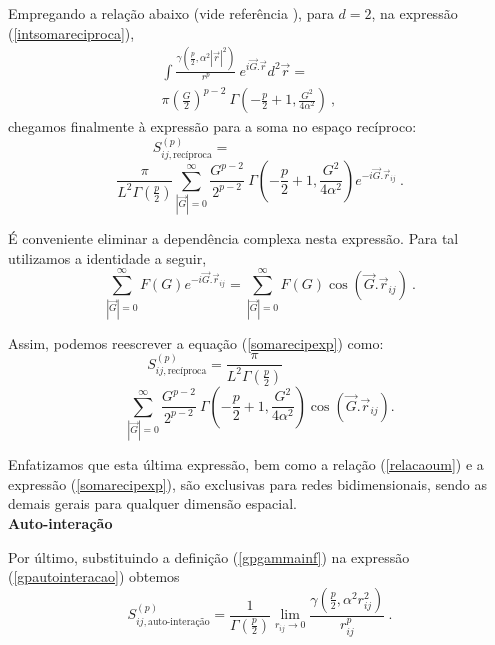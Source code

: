 \documentclass[twocolumn,a4,11pt]{article}
\begin{document}
Empregando a relação abaixo (vide referência \cite{GAO}), para $d=2$, na expressão (\ref{intsomareciproca}),
\begin{eqnarray}
\int \frac{\gamma\left(\frac{p}{2},\alpha^{2} \left| \vec{r} \right|^{2}\right)}{r^{p}} ~ e^{i\vec{G}.\vec{r}} d^{2} \vec{r} = ~~~~~~~~~~~~~~~~
\nonumber \\
\pi \left(\frac{G}{2}\right)^{p-2} ~ \Gamma\left(-\frac{p}{2}+1,\frac{G^{2}}{4 \alpha^{2}}\right) ~,
\label{relacaoum}
\end{eqnarray}
chegamos finalmente à expressão para a soma no espaço recíproco:
\begin{equation}
S^{(p)}_{ij,\text{recíproca}} =
~~~~~~~~~~~~~~~~~~~~~~~~~~~~~~~~~~~~~~~~~~~~
\nonumber
\end{equation}
\begin{equation}
\frac{ \pi}{L^{2} \Gamma\left(\frac{p}{2}\right) }
\sum_{|\vec{G}|=0}^{\infty}
\frac{G^{p-2}}{2^{p-2}} ~
\Gamma\left(-\frac{p}{2}+1,\frac{G^{2}}{4 \alpha^{2}}\right)
e^{-i \vec{G}.\vec{r}_{ij}} ~ .
\label{somarecipexp}
\end{equation}

É conveniente eliminar a dependência complexa nesta expressão. Para tal utilizamos a identidade a seguir,
\begin{equation}
\sum_{|\vec{G}|=0}^{\infty} F(G)e^{-i \vec{G}.\vec{r}_{ij}} =
\sum_{|\vec{G}|=0}^{\infty} F(G)\cos(\vec{G}.\vec{r}_{ij}) ~ .
\nonumber
\end{equation}

Assim, podemos reescrever a equação (\ref{somarecipexp}) como:
\begin{equation}
S^{(p)}_{ij,\text{recíproca}} = \frac{ \pi}{L^{2} \Gamma\left(\frac{p}{2}\right) }
~~~~~~~~~~~~~~~~~~~~~~~~~~~~~
\nonumber
\end{equation}
\begin{equation}
\sum_{|\vec{G}|=0}^{\infty}
\frac{G^{p-2}}{2^{p-2}} ~
\Gamma\left(-\frac{p}{2}+1,\frac{G^{2}}{4 \alpha^{2}}\right)
\cos(\vec{G}.\vec{r}_{ij}) .
\label{somareciproca}
\end{equation}

Enfatizamos que esta última expressão, bem como a relação (\ref{relacaoum}) e a expressão (\ref{somarecipexp}), são exclusivas para redes bidimensionais, sendo as demais gerais para qualquer dimensão espacial.\\


\noindent
{\bf Auto-interação}

Por último, substituindo a definição (\ref{gpgammainf}) na expressão (\ref{gpautointeracao}) obtemos
\begin{equation}
\label{autolimiter}
S_{ij,\text{auto-interação}}^{(p)}=\frac{1}{\Gamma\left(\frac{p}{2}\right) }  \lim_{r_{ij} \rightarrow 0} \frac{
 \gamma\left(\frac{p}{2},\alpha^{2} r_{ij}^{2}\right)}{
r_{ij}^{p} } ~ .
\end{equation}
\end{document}
